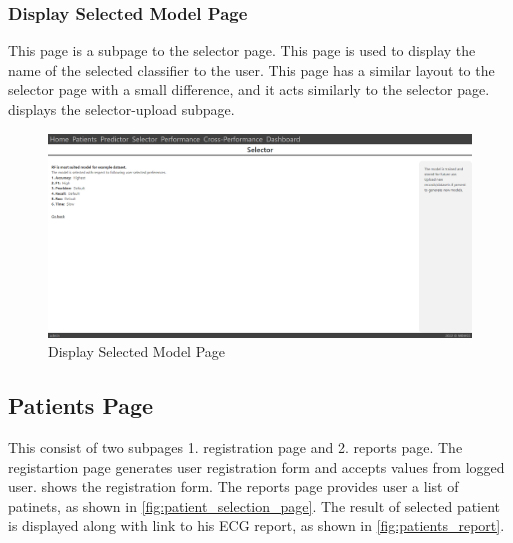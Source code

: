 \subsubsection{Display Selected Model Page} \label{subsec:display_selected_model_page}
This page is a subpage to the selector page. This page is used to display the name of the selected classifier to the user. This page has a similar layout to the selector page with a small difference, and it acts similarly to the selector page.  displays the selector-upload subpage.

\begin{figure}[H]
  \centering
  \includegraphics[width=0.7\columnwidth]{media/website/pages/selector_selected.png}
  \caption{Display Selected Model Page}
  \label{fig:display_selected_model_page}
\end{figure}

\subsection{Patients Page}\label{subsec:patients_page}
This consist of two subpages 1. registration page and 2. reports page. The registartion page generates user registration form and accepts values from logged user.  shows the registration form. The reports page provides user a list of patinets, as shown in \cref{fig:patient_selection_page}. The result of selected patient is displayed along with link to his ECG report, as shown in \cref{fig:patients_report}.

